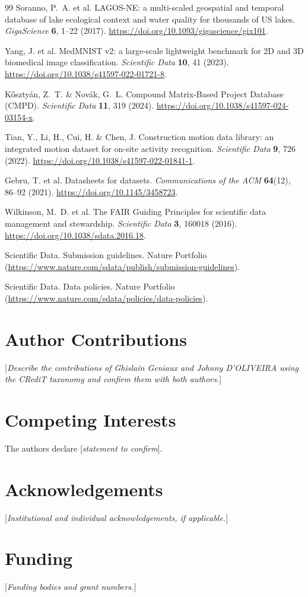 \documentclass[10pt,a4paper]{article}
\newcommand{\placeholder}[1]{\textcolor{draftamber}{[\textit{#1}]}}
\begin{document}
\begin{thebibliography}{99}
Soranno, P.~A. et al. LAGOS-NE: a multi-scaled geospatial and temporal
database of lake ecological context and water quality for thousands of US
lakes. \emph{GigaScience} \textbf{6}, 1--22 (2017).
\url{https://doi.org/10.1093/gigascience/gix101}.

Yang, J. et al. MedMNIST v2: a large-scale lightweight benchmark for 2D and
3D biomedical image classification. \emph{Scientific Data} \textbf{10}, 41
(2023). \url{https://doi.org/10.1038/s41597-022-01721-8}.

K\H{o}szty\'an, Z.~T. \& Nov\'ak, G.~L. Compound Matrix-Based Project
Database (CMPD). \emph{Scientific Data} \textbf{11}, 319 (2024).
\url{https://doi.org/10.1038/s41597-024-03154-x}.

Tian, Y., Li, H., Cui, H. \& Chen, J. Construction motion data library: an
integrated motion dataset for on-site activity recognition.
\emph{Scientific Data} \textbf{9}, 726 (2022).
\url{https://doi.org/10.1038/s41597-022-01841-1}.

Gebru, T. et al. Datasheets for datasets. \emph{Communications of
the ACM} \textbf{64}(12), 86--92 (2021).
\url{https://doi.org/10.1145/3458723}.

Wilkinson, M.~D. et al. The FAIR Guiding Principles for scientific
data management and stewardship. \emph{Scientific Data} \textbf{3},
160018 (2016). \url{https://doi.org/10.1038/sdata.2016.18}.

Scientific Data. Submission guidelines. Nature Portfolio
(\url{https://www.nature.com/sdata/publish/submission-guidelines}).

Scientific Data. Data policies. Nature Portfolio
(\url{https://www.nature.com/sdata/policies/data-policies}).
\end{thebibliography}

\section*{Author Contributions}

\placeholder{Describe the contributions of Ghislain Geniaux and Johnny
D'OLIVEIRA using the CRediT taxonomy and confirm them with both authors.}

\section*{Competing Interests}

The authors declare \placeholder{statement to confirm}.

\section*{Acknowledgements}

\placeholder{Institutional and individual acknowledgements, if applicable.}

\section*{Funding}

\placeholder{Funding bodies and grant numbers.}
\end{document}

